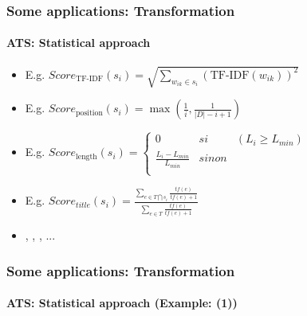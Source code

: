 \documentclass[xcolor=table]{beamer}
\begin{document}
\begin{frame}
	\frametitle{Some applications: Transformation}
	\framesubtitle{ATS: Statistical approach}
	
	\begin{itemize}
		\item {} 
		
		\hspace{.5cm}E.g. $Score_\text{TF-IDF}(s_i) = \sqrt{\sum\limits_{w_{ik} \in s_i} (\text{TF-IDF}(w_{ik}))^2}$
		
		\item {}
		
		\hspace{.5cm}E.g. $ Score_\text{position}(s_i) = \max (\frac{1}{i}, \frac{1}{|D| - i + 1}) $
		
		\item {}
		
		\hspace{.5cm}E.g. $ Score_\text{length}(s_i) = \left\lbrace 
		\begin{array}{lll}
		0 & si & (L_i \geq L_{min}) \\
		\frac{L_i - L_{min}}{L_{min}} & sinon & \\
		\end{array}
		\right. $
		
		\item {}
		
		\hspace{.5cm}E.g. $ Score_{title}(s_i) = \frac{\sum_{e \in T \bigcap s_i}{\frac{tf(e)}{tf(e)+1}}}
		{\sum_{e \in T}{\frac{tf(e)}{tf(e)+1}}} $
		
		\item {}, , , ...
	\end{itemize}
\end{frame}

\begin{frame}
	\frametitle{Some applications: Transformation}
	\framesubtitle{ATS: Statistical approach (Example: \cite{13-aries-al} (1))}
	
	
\end{frame}
\end{document}
